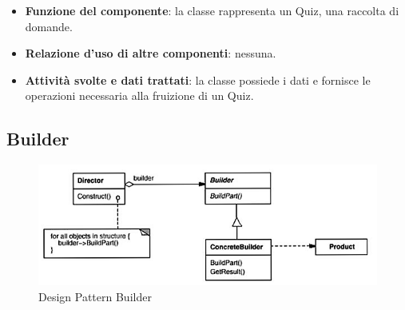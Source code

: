 \begin{itemize}
\item\textbf{Funzione del componente}: la classe rappresenta un Quiz, una raccolta di domande.
	\item\textbf{Relazione d'uso di altre componenti}: nessuna.
	\item\textbf{Attività svolte e dati trattati}: la classe possiede i dati e fornisce le operazioni necessaria alla fruizione di un Quiz.
\end{itemize}
\clearpage










\subsection{Builder}
	\begin{figure}[h!]
	\begin{center}
		\includegraphics[scale=1]{../images/Builder.png}
		\caption{Design Pattern Builder}
	\end{center}
	\end{figure}
